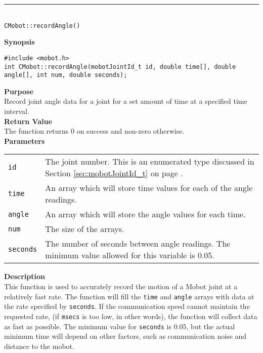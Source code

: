 \noindent
\vspace{5pt}
\rule{4.5in}{0.015in}\\
\noindent
{\LARGE \texttt{CMobot::recordAngle()}}\\
{}

\noindent
{\bf Synopsis}
\vspace{-8pt}
\begin{verbatim}
#include <mobot.h>
int CMobot::recordAngle(mobotJointId_t id, double time[], double angle[], int num, double seconds);
\end{verbatim}

\noindent
{\bf Purpose}\\
Record joint angle data for a joint for a set amount of time at a specified time interval.\\

\noindent
{\bf Return Value}\\
The function returns 0 on success and non-zero otherwise.\\

\noindent
{\bf Parameters}\\
\vspace{-0.1in}
\begin{description}
\item               
\begin{tabular}{p{15 mm}p{145 mm}}
\texttt{id} & The joint number. This is an enumerated type 
discussed in Section \ref{sec:mobotJointId_t} on page
\pageref{sec:mobotJointId_t}.\\
\texttt{time} & An array which will store time values for each of the angle readings. \\
\texttt{angle} & An array which will store the angle values for each time. \\
\texttt{num} & The size of the arrays. \\
\texttt{seconds} & The number of seconds between angle readings. The minimum value allowed for
this variable is 0.05.
\end{tabular}
\end{description}

\noindent
{\bf Description}\\
This function is used to accurately record the motion of a Mobot joint at a relatively fast
rate. The function will fill the \texttt{time} and \texttt{angle} arrays with data
at the rate specified by \texttt{seconds}. If the communication speed cannot maintain 
the requested rate, (if \texttt{msecs} is too low, in other words), the function will
collect data as fast as possible. The minimum value for \texttt{seconds} is 0.05, but
the actual minimum time will depend on other factors, such as communication noise and
distance to the mobot.

